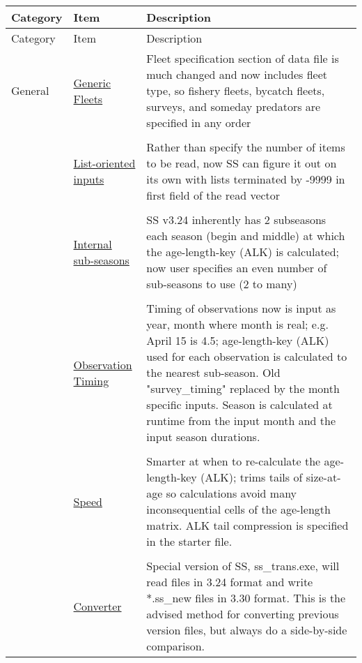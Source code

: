		\begin{center}
			\begin{longtable}{p{2cm} p{3cm} p{10cm}}
				Category & Item & Description\\
				\hline
				\endfirsthead
		
				Category & Item & Description\\
				\hline
				\endhead
		
				\hline
				\endfoot
		
				\endlastfoot
				
				General & 
					\hyperlink{GenericFleets}{Generic Fleets} & 
						Fleet specification section of data file is much changed and now includes fleet type, so fishery fleets, bycatch fleets, surveys, and someday predators are specified in any order\\
				  \\
				  & \hyperlink{ListBased}{List-oriented inputs} & 
					    Rather than specify the number of items to be read, now SS can figure it out on its own with lists terminated by -9999 in first field of the read vector \\
				  \\					  
				  & \hyperlink{SubSeas}{Internal sub-seasons} & 
					    SS v3.24 inherently has 2 subseasons each season (begin and middle) at which the age-length-key (ALK) is calculated; now user specifies an even number of sub-seasons to use (2 to many) \\
				  \\
				  & \hyperlink{ObsTiming}{Observation Timing} & 
					    Timing of observations now is input as year, month where month is real; e.g. April 15 is 4.5; age-length-key (ALK) used for each observation is calculated to the nearest sub-season.  Old "survey\_timing" replaced by the month specific inputs.  Season is calculated at runtime from the input month and the input season durations. \\
				  \\
				  & \hyperlink{ALK}{Speed} & 
					    Smarter at when to re-calculate the age-length-key (ALK); trims tails of size-at-age so calculations avoid many inconsequential cells of the age-length matrix. ALK tail compression is specified in the starter file.\\
				  \\				
				  & \hyperlink{Convert} {Converter} & 
					    Special version of SS, ss\_trans.exe, will read files in 3.24 format and write *.ss\_new files in 3.30 format.  This is the advised method for converting previous version files, but always do a side-by-side comparison.\\

\end{longtable}
\end{center}
